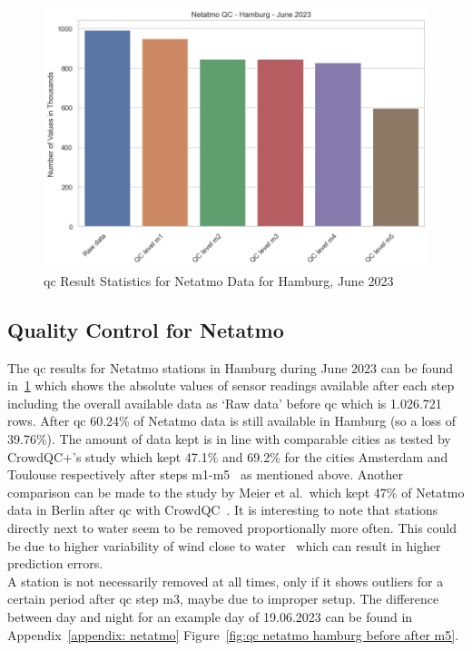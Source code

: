 \begin{figure}[htp]
    \centering
    \includegraphics[width=1\textwidth]{images/netatmo_qc_june_23.png}
    \caption{\gls{qc} Result Statistics for Netatmo Data for Hamburg, June 2023}
    \label{fig:qc netatmo june 23}
\end{figure}

\subsection{Quality Control for Netatmo}

The \gls{qc} results for Netatmo stations in Hamburg during June 2023 can be found in~\ref{fig:qc netatmo june 23} which shows the absolute values of sensor readings available after each step including the overall available data as `Raw data' before \gls{qc} which is 1.026.721 rows.
After \gls{qc} 60.24\% of Netatmo data is still available in Hamburg (so a loss of 39.76\%). The amount of data kept is in line with comparable cities as tested by CrowdQC+'s study which kept 47.1\% and 69.2\% for the cities Amsterdam and Toulouse respectively after steps m1-m5~\cite{fenner2021crowdqc+} as mentioned above. Another comparison can be made to the study by Meier et al.\ which kept 47\% of Netatmo data in Berlin after \gls{qc} with CrowdQC~\cite{meier2017crowdsourcing}.
It is interesting to note that stations directly next to water seem to be removed proportionally more often. This could be due to higher variability of wind close to water~\cite{ho2014mapping} which can result in higher prediction errors.\\
A station is not necessarily removed at all times, only if it shows outliers for a certain period after \gls{qc} step m3, maybe due to improper setup. The difference between day and night for an example day of 19.06.2023 can be found in Appendix~\ref{appendix: netatmo}  Figure~\ref{fig:qc netatmo hamburg before after m5}.

